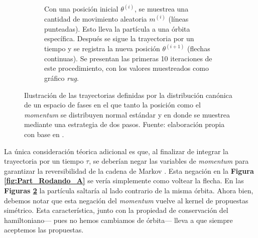 \begin{figure}
\begin{subfigure}{0.4\textwidth}
        \caption{Con una posición inicial $\theta^{(i)}$, se muestrea una cantidad de movimiento aleatoria $m^{(i)}$ (líneas punteadas). Esto lleva la partícula a una órbita específica. Después se sigue la trayectoria por un tiempo y se registra la nueva posición $\theta^{(i+1)}$ (flechas continuas). Se presentan las primeras 10 iteraciones de este procedimiento, con los valores muestreados como gráfico \textit{rug}.}
        \label{fig:Primeras_Trayectorias}
    \end{subfigure}
	\caption{Ilustración de las trayectorias definidas por la distribución canónica de un espacio de fases en el que tanto la posición como el \textit{momentum} se distribuyen normal estándar y en donde se muestrea mediante una estrategia de dos pasos. Fuente: elaboración propia con base en \textcite{Betancourt17}.}
	\label{fig:Trayectorias_Espacio_Fase}	
\end{figure}
 
La única consideración téorica adicional es que, al finalizar de integrar la trayectoria por un tiempo $\tau$, se deberían negar las variables de \textit{momentum} para garantizar la reversibilidad de la cadena de Markov \parencite{Neal93,Neal11,Betancourt17}. Esta negación en la \textbf{Figura \ref{fig:Part_Rodando_A}} se vería simplemente como voltear la flecha. En las \textbf{Figuras \ref{fig:Trayectorias_Espacio_Fase}} la partícula saltaría al lado contrario de la misma órbita. Ahora bien, debemos notar que esta negación del \textit{momentum} vuelve al kernel de propuestas simétrico. Esta característica, junto con la propiedad de conservación del hamiltoniano--- pues no hemos cambiamos de órbita--- lleva a que siempre aceptemos las propuestas.\\ 

